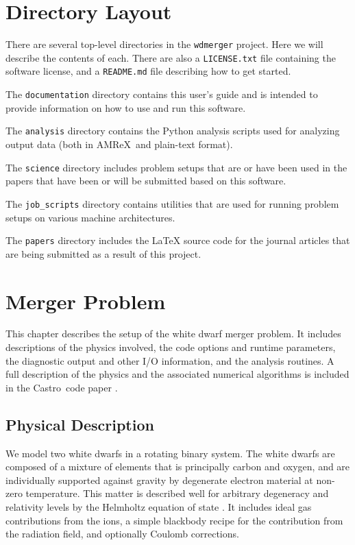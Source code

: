 \documentclass[12pt]{book}
\newcommand{\castro}{{\sf Castro}}
\newcommand{\amrex}{{\sf AMReX}}
\begin{document}
\chapter{Directory Layout}

There are several top-level directories in the \texttt{wdmerger} project. Here we will describe
the contents of each. There are also a \texttt{LICENSE.txt} file containing the software license,
and a \texttt{README.md} file describing how to get started.

The \texttt{documentation} directory contains this user's guide and is intended to provide information
on how to use and run this software.

The \texttt{analysis} directory contains the Python analysis scripts used for analyzing output
data (both in \amrex\ and plain-text format). 

The \texttt{science} directory includes problem setups that are or have been used in the papers
that have been or will be submitted based on this software.

The \texttt{job\_scripts} directory contains utilities that are used for running
problem setups on various machine architectures.

The \texttt{papers} directory includes the LaTeX source code for the journal articles
that are being submitted as a result of this project.



\chapter{Merger Problem}

This chapter describes the setup of the white dwarf merger problem. It includes descriptions of 
the physics involved, the code options and runtime parameters, the diagnostic output 
and other I/O information, and the analysis routines. A full description of the physics 
and the associated numerical algorithms is included in the \castro\ code paper \cite{castro}.

\section{Physical Description}

We model two white dwarfs in a rotating binary system. The white dwarfs are composed of 
a mixture of elements that is principally carbon and oxygen, and are individually supported 
against gravity by degenerate electron material at non-zero temperature. This matter is described well 
for arbitrary degeneracy and relativity levels by the Helmholtz equation of state \cite{timmes_swesty:2000}.
It includes ideal gas contributions from the ions, a simple blackbody recipe for the contribution from 
the radiation field, and optionally Coulomb corrections. 
\end{document}
